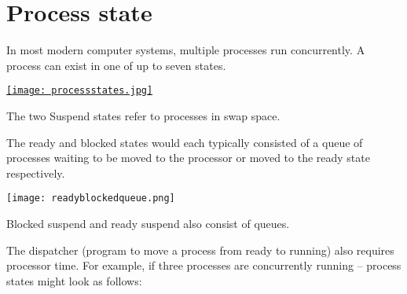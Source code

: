 \documentclass[10pt,a4paper,openany]{book}
\begin{document}
    \section{Process state}
    In most modern computer systems, multiple processes run concurrently. A process can exist in one of up to seven states.

    \begin{center}
    \href{http://mcom.cit.ie/staff/Computing/prothwell/bbsos/notes/os03a_files/image002.jpg}{\texttt{[image: processstates.jpg]}}
    \end{center}

    The two Suspend states refer to processes in swap space.

    The ready and blocked states would each typically consisted of a queue of processes waiting to be moved to the processor or moved to the ready state respectively.

    \begin{center}
    \texttt{[image: readyblockedqueue.png]}
    \end{center}

    Blocked suspend and ready suspend also consist of queues.

    The dispatcher (program to move a process from ready to running) also requires processor time. For example, if three processes are concurrently running – process states might look as follows:
\end{document}
